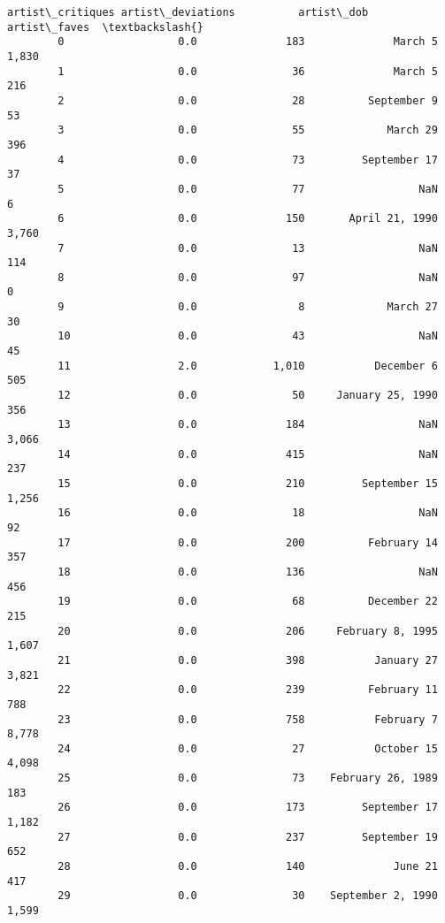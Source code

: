 \documentclass[11pt]{article}
\begin{document}
\begin{Verbatim}[commandchars=\\\{\}]
              artist\_critiques artist\_deviations          artist\_dob artist\_faves  \textbackslash{}
        0                  0.0              183              March 5       1,830    
        1                  0.0               36              March 5         216    
        2                  0.0               28          September 9          53    
        3                  0.0               55             March 29         396    
        4                  0.0               73         September 17          37    
        5                  0.0               77                  NaN           6    
        6                  0.0              150       April 21, 1990       3,760    
        7                  0.0               13                  NaN         114    
        8                  0.0               97                  NaN           0    
        9                  0.0                8             March 27          30    
        10                 0.0               43                  NaN          45    
        11                 2.0            1,010           December 6         505    
        12                 0.0               50     January 25, 1990         356    
        13                 0.0              184                  NaN       3,066    
        14                 0.0              415                  NaN         237    
        15                 0.0              210         September 15       1,256    
        16                 0.0               18                  NaN          92    
        17                 0.0              200          February 14         357    
        18                 0.0              136                  NaN         456    
        19                 0.0               68          December 22         215    
        20                 0.0              206     February 8, 1995       1,607    
        21                 0.0              398           January 27       3,821    
        22                 0.0              239          February 11         788    
        23                 0.0              758           February 7       8,778    
        24                 0.0               27           October 15       4,098    
        25                 0.0               73    February 26, 1989         183    
        26                 0.0              173         September 17       1,182    
        27                 0.0              237         September 19         652    
        28                 0.0              140              June 21         417    
        29                 0.0               30    September 2, 1990       1,599    

\end{Verbatim}
\end{document}
